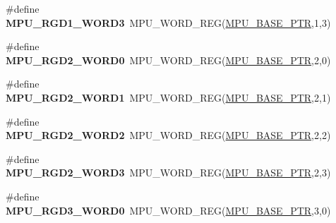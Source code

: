 \begin{DoxyCompactItemize}
\item 
\hypertarget{group___m_p_u___register___accessor___macros_gab5bd4f7ae1941ab1fae2363f1b402ade}{}\#define {\bfseries M\+P\+U\+\_\+\+R\+G\+D1\+\_\+\+W\+O\+R\+D3}~M\+P\+U\+\_\+\+W\+O\+R\+D\+\_\+\+R\+E\+G(\hyperlink{group___m_p_u___peripheral_gae2d60f80178d84225d77e5f0214d1f1d}{M\+P\+U\+\_\+\+B\+A\+S\+E\+\_\+\+P\+T\+R},1,3)\label{group___m_p_u___register___accessor___macros_gab5bd4f7ae1941ab1fae2363f1b402ade}

\item 
\hypertarget{group___m_p_u___register___accessor___macros_ga27f7d3e91bf447b38be4687e39529f2c}{}\#define {\bfseries M\+P\+U\+\_\+\+R\+G\+D2\+\_\+\+W\+O\+R\+D0}~M\+P\+U\+\_\+\+W\+O\+R\+D\+\_\+\+R\+E\+G(\hyperlink{group___m_p_u___peripheral_gae2d60f80178d84225d77e5f0214d1f1d}{M\+P\+U\+\_\+\+B\+A\+S\+E\+\_\+\+P\+T\+R},2,0)\label{group___m_p_u___register___accessor___macros_ga27f7d3e91bf447b38be4687e39529f2c}

\item 
\hypertarget{group___m_p_u___register___accessor___macros_ga0d02a8934264e559ede948b61da3d3da}{}\#define {\bfseries M\+P\+U\+\_\+\+R\+G\+D2\+\_\+\+W\+O\+R\+D1}~M\+P\+U\+\_\+\+W\+O\+R\+D\+\_\+\+R\+E\+G(\hyperlink{group___m_p_u___peripheral_gae2d60f80178d84225d77e5f0214d1f1d}{M\+P\+U\+\_\+\+B\+A\+S\+E\+\_\+\+P\+T\+R},2,1)\label{group___m_p_u___register___accessor___macros_ga0d02a8934264e559ede948b61da3d3da}

\item 
\hypertarget{group___m_p_u___register___accessor___macros_ga1acf5c43b8a76d3e41a2b2b31722fd7c}{}\#define {\bfseries M\+P\+U\+\_\+\+R\+G\+D2\+\_\+\+W\+O\+R\+D2}~M\+P\+U\+\_\+\+W\+O\+R\+D\+\_\+\+R\+E\+G(\hyperlink{group___m_p_u___peripheral_gae2d60f80178d84225d77e5f0214d1f1d}{M\+P\+U\+\_\+\+B\+A\+S\+E\+\_\+\+P\+T\+R},2,2)\label{group___m_p_u___register___accessor___macros_ga1acf5c43b8a76d3e41a2b2b31722fd7c}

\item 
\hypertarget{group___m_p_u___register___accessor___macros_gab85c0accc674d2ea25f3cc7440f1a10b}{}\#define {\bfseries M\+P\+U\+\_\+\+R\+G\+D2\+\_\+\+W\+O\+R\+D3}~M\+P\+U\+\_\+\+W\+O\+R\+D\+\_\+\+R\+E\+G(\hyperlink{group___m_p_u___peripheral_gae2d60f80178d84225d77e5f0214d1f1d}{M\+P\+U\+\_\+\+B\+A\+S\+E\+\_\+\+P\+T\+R},2,3)\label{group___m_p_u___register___accessor___macros_gab85c0accc674d2ea25f3cc7440f1a10b}

\item 
\hypertarget{group___m_p_u___register___accessor___macros_ga6f8ae98e9a4c49f6dddec3363a7322cf}{}\#define {\bfseries M\+P\+U\+\_\+\+R\+G\+D3\+\_\+\+W\+O\+R\+D0}~M\+P\+U\+\_\+\+W\+O\+R\+D\+\_\+\+R\+E\+G(\hyperlink{group___m_p_u___peripheral_gae2d60f80178d84225d77e5f0214d1f1d}{M\+P\+U\+\_\+\+B\+A\+S\+E\+\_\+\+P\+T\+R},3,0)\label{group___m_p_u___register___accessor___macros_ga6f8ae98e9a4c49f6dddec3363a7322cf}


\end{DoxyCompactItemize}
